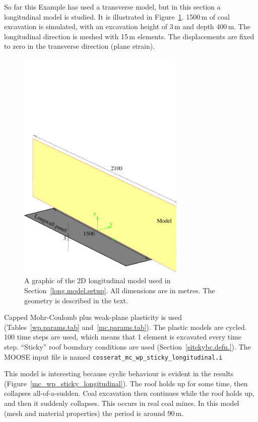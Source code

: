 \documentclass[]{scrreprt}
\begin{document}
So far this Example has used a transverse model, but in this section a
longitudinal model is studied.  It is illustrated in
Figure~\ref{long_model.fig}.  1500\,m of coal excavation is simulated,
with an excavation height of 3\,m and depth 400\,m.  The longitudinal direction is
meshed with 15\,m elements.  The displacements are fixed to zero in
the transverse direction (plane strain).

\begin{figure}[htb]
\begin{center}
\includegraphics[width=8cm]{longitudinal_model_seup.pdf}
\caption{A graphic of the 2D longitudinal model used in Section~\ref{long.model.setup}.  All
  dimensions are in metres.  The geometry is described in the text.}
\label{long_model.fig}
\end{center}
\end{figure}


Capped Mohr-Coulomb plus weak-plane plasticity is used
(Tables~\ref{wp.params.tab} and~\ref{mc.params.tab}).  The plastic
models are cycled.  100 time steps are used, which means that 1
element is excavated every time step.  ``Sticky'' roof boundary
conditions are used (Section~\ref{sitckybc.defn.}).    The MOOSE input file
is named {\tt cosserat\_mc\_wp\_sticky\_longitudinal.i}

This model is interesting because cyclic behaviour is evident in the
results (Figure~\ref{mc_wp_sticky_longitudinal}).  The
roof holds up for some time, then collapses all-of-a-sudden.  Coal
excavation then continues while the roof holds up, and then it
suddenly collapses.  This occurs in real coal mines.  In this model
(mesh and material properties) the period is around
90\,m.
\end{document}
